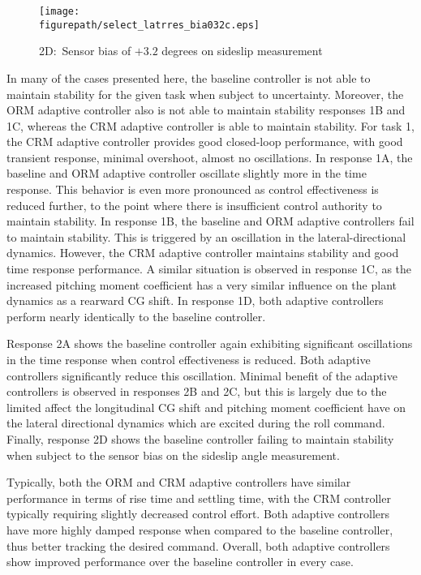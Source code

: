 \documentclass[]{../sty/aiaa-tc}
\newcommand{\figurepath}{../fig}
\begin{document}
  \begin{figure}[H]
    \begin{center}
      \texttt{[image: \\figurepath/select\_latrres\_bia032c.eps]}
      \caption{2D:\ Sensor bias of $+3.2$ degrees on sideslip measurement}
    \end{center}
  \end{figure}

  In many of the cases presented here, the baseline controller is not able to maintain stability for the given task when subject to uncertainty.
  Moreover, the ORM adaptive controller also is not able to maintain stability responses 1B and 1C, whereas the CRM adaptive controller is able to maintain stability.
  For task 1, the CRM adaptive controller provides good closed-loop performance, with good transient response, minimal overshoot, almost no oscillations.
  In response 1A, the baseline and ORM adaptive controller oscillate slightly more in the time response.
  This behavior is even more pronounced as control effectiveness is reduced further, to the point where there is insufficient control authority to maintain stability.
  In response 1B, the baseline and ORM adaptive controllers fail to maintain stability.
  This is triggered by an oscillation in the lateral-directional dynamics.
  However, the CRM adaptive controller maintains stability and good time response performance.
  A similar situation is observed in response 1C, as the increased pitching moment coefficient has a very similar influence on the plant dynamics as a rearward CG shift.
  In response 1D, both adaptive controllers perform nearly identically to the baseline controller.

  Response 2A shows the baseline controller again exhibiting significant oscillations in the time response when control effectiveness is reduced.
  Both adaptive controllers significantly reduce this oscillation.
  Minimal benefit of the adaptive controllers is observed in responses 2B and 2C, but this is largely due to the limited affect the longitudinal CG shift and pitching moment coefficient have on the lateral directional dynamics which are excited during the roll command.
  Finally, response 2D shows the baseline controller failing to maintain stability when subject to the sensor bias on the sideslip angle measurement.

  Typically, both the ORM and CRM adaptive controllers have similar performance in terms of rise time and settling time, with the CRM controller typically requiring slightly decreased control effort.
  Both adaptive controllers have more highly damped response when compared to the baseline controller, thus better tracking the desired command.
  Overall, both adaptive controllers show improved performance over the baseline controller in every case.
\end{document}
